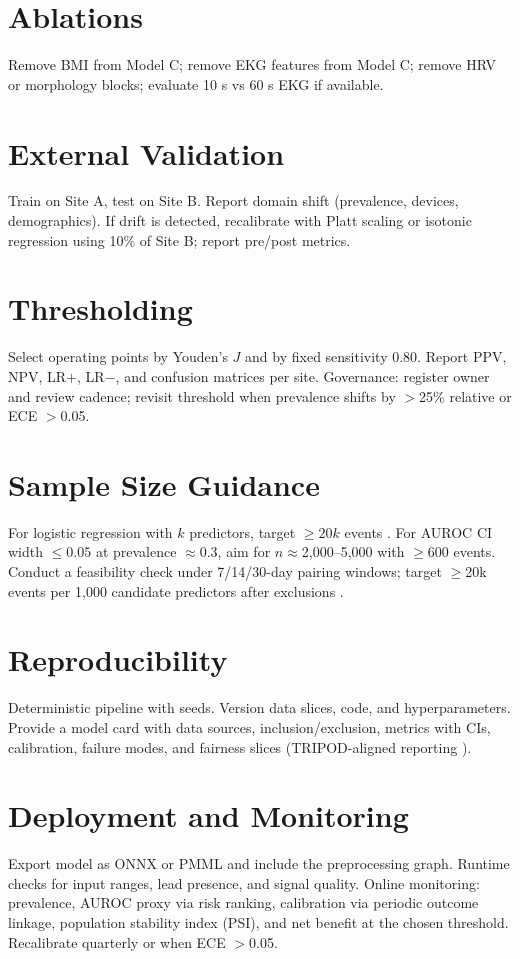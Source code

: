 \documentclass[11pt]{article}
\begin{document}
\section{Ablations}
Remove BMI from Model C; remove EKG features from Model C; remove HRV or morphology blocks; evaluate 10 s vs 60 s EKG if available.

\section{External Validation}
Train on Site A, test on Site B. Report domain shift (prevalence, devices, demographics). If drift is detected, recalibrate with Platt scaling \citep{platt1999} or isotonic regression \citep{zadrozny2002calibration} using 10\% of Site B; report pre/post metrics.

\section{Thresholding}
Select operating points by Youden's $J$ \citep{youden1950index} and by fixed sensitivity 0.80. Report PPV, NPV, LR$+$, LR$-$, and confusion matrices per site. Governance: register owner and review cadence; revisit threshold when prevalence shifts by $>$25\% relative or ECE $>$0.05.

\section{Sample Size Guidance}
For logistic regression with $k$ predictors, target $\ge 20k$ events \citep{steyerberg2019clinical}. For AUROC CI width $\le 0.05$ at prevalence $\approx0.3$, aim for $n\approx$2{,}000--5{,}000 with $\ge$600 events. Conduct a feasibility check under 7/14/30-day pairing windows; target $\ge$20k events per 1{,}000 candidate predictors after exclusions \citep{riley2020sample}.

\section{Reproducibility}
Deterministic pipeline with seeds. Version data slices, code, and hyperparameters. Provide a model card with data sources, inclusion/exclusion, metrics with CIs, calibration, failure modes, and fairness slices (TRIPOD-aligned reporting \citep{collins2015tripod}).

\section{Deployment and Monitoring}
Export model as ONNX or PMML and include the preprocessing graph. Runtime checks for input ranges, lead presence, and signal quality. Online monitoring: prevalence, AUROC proxy via risk ranking, calibration via periodic outcome linkage, population stability index (PSI), and net benefit at the chosen threshold. Recalibrate quarterly or when ECE $>$0.05.
\end{document}
